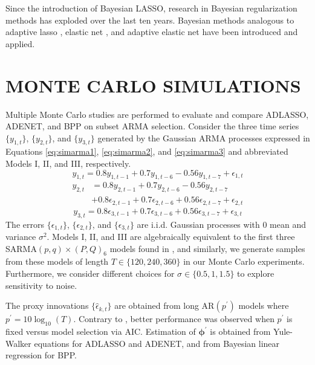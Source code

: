 Since the introduction of Bayesian LASSO, research in Bayesian regularization methods has exploded over the last ten years. Bayesian methods analogous to adaptive lasso \citep{Leng2014}, elastic net \citep{Li2010a}, and adaptive elastic net \citep{Stankiewicz2015} have been introduced and applied. \cite{Polson2010}





\section{MONTE CARLO SIMULATIONS}
\label{sec:mc}
Multiple Monte Carlo studies are performed to evaluate and compare ADLASSO, ADENET, and BPP on subset ARMA selection. Consider the three time series $\{y_{1,t}\}$, $\{y_{2,t}\}$, and $\{y_{3,t}\}$ generated by the Gaussian ARMA processes expressed in Equations \ref{eq:simarma1}, \ref{eq:simarma2}, and \ref{eq:simarma3} and abbreviated Models I, II, and III, respectively.
\begin{equation}
	\label{eq:simarma1}
	y_{1,t}=0.8y_{1,t-1}+0.7y_{1,t-6}-0.56y_{1,t-7}+\epsilon_{1,t}
\end{equation}
\begin{equation}
	\begin{split}
	\label{eq:simarma2}
	y_{2,t}&=0.8y_{2,t-1}+0.7y_{2,t-6}-0.56y_{2,t-7}\\
	&+0.8\epsilon_{2,t-1}+0.7\epsilon_{2,t-6}+0.56\epsilon_{2,t-7}+\epsilon_{2,t}
	\end{split}
\end{equation}
\begin{equation}
	\label{eq:simarma3}
	y_{3,t}=0.8\epsilon_{3,t-1}+0.7\epsilon_{3,t-6}+0.56\epsilon_{3,t-7}+\epsilon_{3,t}
\end{equation}
The errors $\{\epsilon_{1,t}\}$, $\{\epsilon_{2,t}\}$, and $\{\epsilon_{3,t}\}$ are i.i.d. Gaussian processes with $0$ mean and variance $\sigma^2$. Models I, II, and III are algebraically equivalent to the first three SARMA$(p,q)\times(P,Q)_6$ models found in \cite{Chen2011}, and similarly, we generate samples from these models of length $T\in \{120, 240, 360\}$ in our Monte Carlo experiments. Furthermore, we consider different choices for $\sigma\in\{0.5,1,1.5\}$ to explore sensitivity to noise. 

The proxy innovations $\{\hat{\epsilon}_{k,t}\}$ are obtained from long AR$(p^\prime)$ models where $p^\prime=10\log_{10}(T)$. Contrary to \cite{Chen2011}, better performance was observed when $p^\prime$ is fixed versus model selection via AIC. Estimation of $\bm{\phi}^\prime$ is obtained from Yule-Walker equations for ADLASSO and ADENET, and from Bayesian linear regression for BPP.

